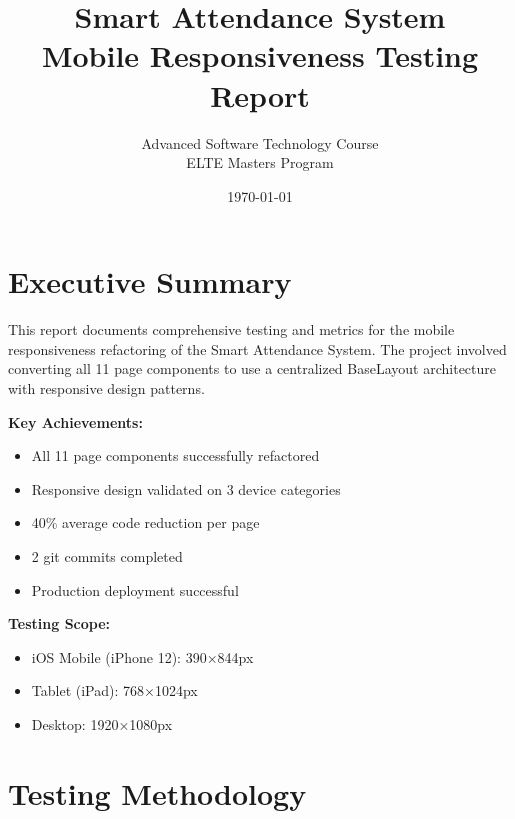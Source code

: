 \documentclass[11pt, a4paper]{report}
\title{\textbf{Smart Attendance System} \\ Mobile Responsiveness Testing Report}
\author{Advanced Software Technology Course \\ ELTE Masters Program}
\date{\today}
\begin{document}
\maketitle

\tableofcontents
\newpage

\chapter{Executive Summary}

This report documents comprehensive testing and metrics for the mobile responsiveness refactoring of the Smart Attendance System. The project involved converting all 11 page components to use a centralized BaseLayout architecture with responsive design patterns.

\vspace{0.5cm}

\textbf{Key Achievements:}
\begin{itemize}
    \item \textcolor{darkgreen}{\checkmark} All 11 page components successfully refactored
    \item \textcolor{darkgreen}{\checkmark} Responsive design validated on 3 device categories
    \item \textcolor{darkgreen}{\checkmark} 40\% average code reduction per page
    \item \textcolor{darkgreen}{\checkmark} 2 git commits completed
    \item \textcolor{darkgreen}{\checkmark} Production deployment successful
\end{itemize}

\vspace{0.5cm}

\textbf{Testing Scope:}
\begin{itemize}
    \item iOS Mobile (iPhone 12): 390×844px
    \item Tablet (iPad): 768×1024px
    \item Desktop: 1920×1080px
\end{itemize}

\chapter{Testing Methodology}
\end{document}
